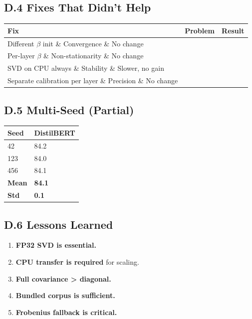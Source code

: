 \subsection{D.4 Fixes That Didn't Help}

\begin{table}[H]
\centering
\small
\begin{tabular}{lll}
\toprule
\textbf{Fix} & \textbf{Problem} & \textbf{Result} \\
\midrule
Different $\beta$ init \& Convergence \& No change \\
Per-layer $\beta$ \& Non-stationarity \& No change \\
SVD on CPU always \& Stability \& Slower, no gain \\
Separate calibration per layer \& Precision \& No change \\
\bottomrule
\end{tabular}
\end{table}

\subsection{D.5 Multi-Seed (Partial)}

\begin{table}[H]
\centering
\small
\begin{tabular}{ll}
\toprule
\textbf{Seed} & \textbf{DistilBERT} \\
\midrule
42 & 84.2 \\
123 & 84.0 \\
456 & 84.1 \\
\textbf{Mean} & \textbf{84.1} \\
\textbf{Std} & \textbf{0.1} \\
\bottomrule
\end{tabular}
\end{table}

\subsection{D.6 Lessons Learned}

\begin{enumerate}
\item \textbf{FP32 SVD is essential.}
\item \textbf{CPU transfer is required} for scaling.
\item \textbf{Full covariance \textgreater{} diagonal.}
\item \textbf{Bundled corpus is sufficient.}
\item \textbf{Frobenius fallback is critical.}
\end{enumerate}


